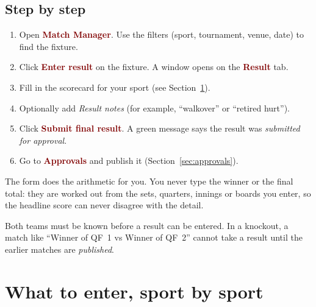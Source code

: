 \documentclass[11pt,a4paper]{article}
\newcommand{\ui}[1]{\textbf{\textcolor{maroon}{#1}}}
\begin{document}
\subsection{Step by step}
\begin{enumerate}
  \item Open \ui{Match Manager}. Use the filters (sport, tournament, venue, date) to find the fixture.
  \item Click \ui{Enter result} on the fixture. A window opens on the \ui{Result} tab.
  \item Fill in the scorecard for your sport (see Section~\ref{sec:sports}).
  \item Optionally add \emph{Result notes} (for example, ``walkover'' or ``retired hurt'').
  \item Click \ui{Submit final result}. A green message says the result was \emph{submitted for approval}.
  \item Go to \ui{Approvals} and publish it (Section~\ref{sec:approvals}).
\end{enumerate}

\begin{tip}
The form does the arithmetic for you. You never type the winner or the final total: they are worked out from the
sets, quarters, innings or boards you enter, so the headline score can never disagree with the detail.
\end{tip}

\begin{warn}
Both teams must be known before a result can be entered. In a knockout, a match like ``Winner of QF~1 vs Winner of QF~2''
cannot take a result until the earlier matches are \emph{published}.
\end{warn}

\section{What to enter, sport by sport}
\label{sec:sports}
\end{document}
